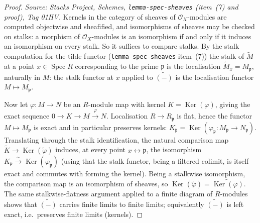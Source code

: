 \begin{proof}
  \textit{Source: Stacks Project, Schemes, \texttt{lemma-spec-sheaves} (item~(7) and
  proof), Tag 01HV.}
  Kernels in the category of sheaves of \(\mathcal{O}_X\)-modules are computed
  objectwise and sheafified, and isomorphisms of sheaves may be checked on stalks: a
  morphism of \(\mathcal{O}_X\)-modules is an isomorphism if and only if it induces an
  isomorphism on every stalk. So it suffices to compare stalks. By the stalk computation
  for the tilde functor (\texttt{lemma-spec-sheaves} item~(7)) the stalk of
  \(\widetilde{M}\) at a point \(x \in \operatorname{Spec} R\) corresponding to the prime
  \(\mathfrak{p}\) is the localisation
  \(\widetilde{M}_x = M_{\mathfrak{p}}\), naturally in \(M\): the stalk functor at \(x\)
  applied to \(\widetilde{(-)}\) is the localisation functor \(M \mapsto M_{\mathfrak{p}}\).

  Now let \(\varphi : M \to N\) be an \(R\)-module map with kernel
  \(K = \operatorname{Ker}(\varphi)\), giving the exact sequence
  \(0 \to K \to M \xrightarrow{\varphi} N\). Localisation \(R \to R_{\mathfrak{p}}\) is
  flat, hence the functor \(M \mapsto M_{\mathfrak{p}}\) is exact and in particular
  preserves kernels: \(K_{\mathfrak{p}} = \operatorname{Ker}(\varphi_{\mathfrak{p}} :
  M_{\mathfrak{p}} \to N_{\mathfrak{p}})\). Translating through the stalk identification,
  the natural comparison map
  \(\widetilde{K} \to \operatorname{Ker}(\widetilde{\varphi})\) induces, at every point
  \(x \leftrightarrow \mathfrak{p}\), the isomorphism \(K_{\mathfrak{p}} \xrightarrow{\sim}
  \operatorname{Ker}(\varphi_{\mathfrak{p}})\) (using that the stalk functor, being a
  filtered colimit, is itself exact and commutes with forming the kernel). Being a
  stalkwise isomorphism, the comparison map is an isomorphism of sheaves, so
  \(\operatorname{Ker}(\widetilde{\varphi}) = \widetilde{\operatorname{Ker}(\varphi)}\).
  The same stalkwise-flatness argument applied to a finite diagram of \(R\)-modules shows
  that \(\widetilde{(-)}\) carries finite limits to finite limits; equivalently
  \(\widetilde{(-)}\) is left exact, i.e.\ preserves finite limits (kernels).

\end{proof}

